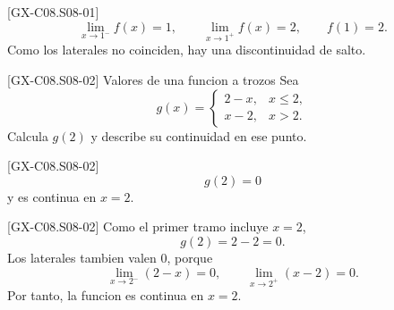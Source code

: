 \begin{fullsolution}{[GX-C08.S08-01]}
\[
\lim_{x\to 1^-}f(x)=1,\qquad \lim_{x\to 1^+}f(x)=2,\qquad f(1)=2.
\]
Como los laterales no coinciden, hay una discontinuidad de salto.
\end{fullsolution}

\begin{guidedexercise}{[GX-C08.S08-02] Valores de una funcion a trozos}
Sea
\[
g(x)=
\begin{cases}
2-x,& x\leq 2,\\
x-2,& x>2.
\end{cases}
\]
Calcula \(g(2)\) y describe su continuidad en ese punto.
\end{guidedexercise}

\begin{shortanswer}{[GX-C08.S08-02]}
\[
g(2)=0
\]
y es continua en \(x=2\).
\end{shortanswer}

\begin{fullsolution}{[GX-C08.S08-02]}
Como el primer tramo incluye \(x=2\),
\[
g(2)=2-2=0.
\]
Los laterales tambien valen \(0\), porque
\[
\lim_{x\to 2^-}(2-x)=0,\qquad \lim_{x\to 2^+}(x-2)=0.
\]
Por tanto, la funcion es continua en \(x=2\).
\end{fullsolution}

